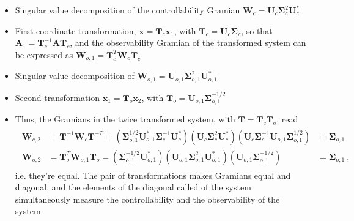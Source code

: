 \documentclass[letterpaper,10pt,english]{jupyterBook}
\begin{document}
\sphinxAtStartPar
{}
\begin{itemize}
\item {} 
\sphinxAtStartPar
Singular value decomposition of the controllability Gramian \(\mathbf{W}_c = \mathbf{U}_c \boldsymbol\Sigma_c^2 \mathbf{U}_c^*\)

\item {} 
\sphinxAtStartPar
First coordinate transformation, \(\mathbf{x} = \mathbf{T}_c \mathbf{x}_1\), with \(\mathbf{T}_c = \mathbf{U}_c \boldsymbol\Sigma_c\), so that  \(\mathbf{A}_1 = \mathbf{T}_c^{-1} \mathbf{A} \mathbf{T}_c\), and the observability Gramian of the transformed system can be expressed as \(\mathbf{W}_{o,1} = \mathbf{T}_c^{T} \mathbf{W}_o \mathbf{T}_c\)

\item {} 
\sphinxAtStartPar
Singular value decomposition of \(\mathbf{W}_{o,1} = \mathbf{U}_{o,1} \boldsymbol\Sigma_{o,1}^2 \mathbf{U}_{o,1}^*\)

\item {} 
\sphinxAtStartPar
Second transformation \(\mathbf{x}_1 = \mathbf{T}_o \mathbf{x}_2\), with \(\mathbf{T}_o = \mathbf{U}_{o,1} \boldsymbol\Sigma_{o,1}^{-1/2}\)

\item {} 
\sphinxAtStartPar
Thus, the Gramians in the twice transformed system, with \(\mathbf{T} = \mathbf{T}_c \mathbf{T}_o\), read
\begin{equation*}
\begin{split}\begin{aligned}
    \mathbf{W}_{c,2} & = \mathbf{T}^{-1} \mathbf{W}_{c} \mathbf{T}^{-T} = \left( \boldsymbol\Sigma_{o,1}^{1/2} \mathbf{U}_{o,1}^* \boldsymbol\Sigma_c^{-1} \mathbf{U}_c^* \right) \left( \mathbf{U}_c \boldsymbol\Sigma_c^2 \mathbf{U}_c^* \right) \left( \mathbf{U}_c \boldsymbol\Sigma_c^{-1} \mathbf{U}_{o,1} \boldsymbol \Sigma_{o,1}^{1/2} \right) & = \boldsymbol\Sigma_{o,1}  \\
    \mathbf{W}_{o,2} & = \mathbf{T}_o^T \mathbf{W}_{o,1} \mathbf{T}_o = \left( \boldsymbol\Sigma_{o,1}^{-1/2} \mathbf{U}_{o,1}^* \right) \left( \mathbf{U}_{o,1} \boldsymbol\Sigma_{o,1}^2 \mathbf{U}_{o,1}^* \right) \left( \mathbf{U}_{o,1} \boldsymbol\Sigma_{o,1}^{-1/2} \right) & = \boldsymbol\Sigma_{o,1} \ ,
  \end{aligned}\end{split}
\end{equation*}
\sphinxAtStartPar
i.e. they’re equal. The pair of transformations makes Gramians equal and diagonal, and the elements of the diagonal \sphinxhyphen{} called  of the system \sphinxhyphen{} simultaneously measure the controllability and the observability of the system.

\end{itemize}
\end{document}
